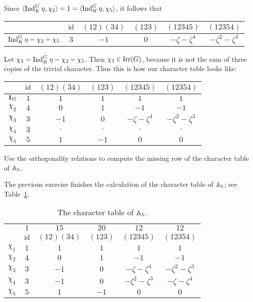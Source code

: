 Since 
$\langle\operatorname{Ind}_K^G\eta,\chi_2\rangle=1=\langle\operatorname{Ind}_H^G\eta,\chi_5\rangle$,
it follows that 
\bigskip 
\begin{center}
        \begin{tabular}{|c|ccccc|}
        \hline  
         & $\operatorname{id}$ & $(12)(34)$ & $(123)$ & $(12345)$ & $(12354)$\\
         \hline 
         $\operatorname{Ind}_K^G\eta-\chi_2-\chi_5$ & $3$ & $-1$ & $0$ & $-\zeta-\zeta^4$ & $-\zeta^2-\zeta^3$\\
         \hline 
\end{tabular}
\end{center}
\bigskip 
Let $\chi_3=\operatorname{Ind}_K^G\eta-\chi_2-\chi_5$. Then $\chi_3\in\operatorname{Irr}(G)$, because it is
not the sum of three copies of the trivial character. Thus this is how our character table looks like: 
\bigskip
\begin{center}
        \begin{tabular}{|c|ccccc|}
        \hline  
         & $\operatorname{id}$ & $(12)(34)$ & $(123)$ & $(12345)$ & $(12354)$\\
        \hline 
        $\mathbf{1}_G$ & $1$ & $1$ & $1$ & $1$ & $1$\\
        $\chi_2$ & $4$ & $0$ & $1$ & $-1$ & $-1$\\
        $\chi_3$ & $3$ & $-1$ & $0$ & $-\zeta-\zeta^4$ & $-\zeta^2-\zeta^3$\\
        $\chi_4$ & $3$ & $\cdot$ & $\cdot$ & $\cdot$& $\cdot$\\
        $\chi_5$ & $5$ & $1$ & $-1$ & $0$& $0$\\
        \hline 
    \end{tabular}
\end{center}
\bigskip 

\begin{exercise}
    Use the orthogonality relations
    to compute the missing row of the character table
    of $\mathbb{A}_5$. 
\end{exercise}

The previous exercise finishes the calculation
of the character table of $\mathbb{A}_5$; see Table~\ref{tab:A5}. 

\begin{table}[h]
\caption{The character table of $\mathbb{A}_5$.}
\label{tab:A5}
        \begin{tabular}{|c|ccccc|}
        \hline  
        & $1$ & $15$ & $20$ & $12$ & $12$ \\
         & $\operatorname{id}$ & $(12)(34)$ & $(123)$ & $(12345)$ & $(12354)$\\
        \hline 
        $\chi_1$ & $1$ & $1$ & $1$ & $1$ & $1$\\
        $\chi_2$ & $4$ & $0$ & $1$ & $-1$ & $-1$\\
        $\chi_3$ & $3$ & $-1$ & $0$ & $-\zeta-\zeta^4$ & $-\zeta^2-\zeta^3$\\
        $\chi_4$ & $3$ &  $-1$ & $0$ & $-\zeta^2-\zeta^3$ & $-\zeta-\zeta^4$ \\
        $\chi_5$ & $5$ & $1$ & $-1$ & $0$& $0$\\
        \hline 
    \end{tabular}
\end{table}

